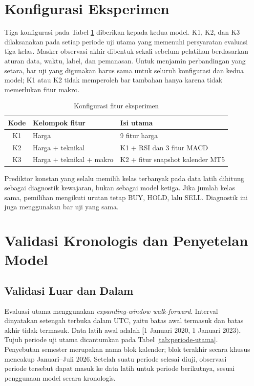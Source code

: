 \section{Konfigurasi Eksperimen}

Tiga konfigurasi pada Tabel \ref{tab:konfigurasi-fitur} diberikan kepada kedua model. K1, K2, dan K3 dilaksanakan pada setiap periode uji utama yang memenuhi persyaratan evaluasi tiga kelas. Masker observasi akhir dibentuk sekali sebelum pelatihan berdasarkan aturan data, waktu, label, dan pemanasan. Untuk menjamin perbandingan yang setara, bar uji yang digunakan harus sama untuk seluruh konfigurasi dan kedua model; K1 atau K2 tidak memperoleh bar tambahan hanya karena tidak memerlukan fitur makro.

\begin{table}[htbp]
    \centering
    \caption{Konfigurasi fitur eksperimen}
    \label{tab:konfigurasi-fitur}
    \begin{tabular}{cll}
        \hline
        Kode & Kelompok fitur & Isi utama \\
        \hline
        K1 & Harga & 9 fitur harga \\
        K2 & Harga + teknikal & K1 + RSI dan 3 fitur MACD \\
        K3 & Harga + teknikal + makro & K2 + fitur snapshot kalender MT5 \\
        \hline
    \end{tabular}
\end{table}

Prediktor konstan yang selalu memilih kelas terbanyak pada data latih dihitung sebagai diagnostik kewajaran, bukan sebagai model ketiga. Jika jumlah kelas sama, pemilihan mengikuti urutan tetap BUY, HOLD, lalu SELL. Diagnostik ini juga menggunakan bar uji yang sama.

\section{Validasi Kronologis dan Penyetelan Model}

\subsection{Validasi Luar dan Dalam}

Evaluasi utama menggunakan \emph{expanding-window walk-forward}. Interval dinyatakan setengah terbuka dalam UTC, yaitu batas awal termasuk dan batas akhir tidak termasuk. Data latih awal adalah $[1$ Januari 2020, $1$ Januari 2023$)$. Tujuh periode uji utama dicantumkan pada Tabel \ref{tab:periode-utama}. Penyebutan semester merupakan nama blok kalender; blok terakhir secara khusus mencakup Januari--Juli 2026. Setelah suatu periode selesai diuji, observasi periode tersebut dapat masuk ke data latih untuk periode berikutnya, sesuai penggunaan model secara kronologis.

